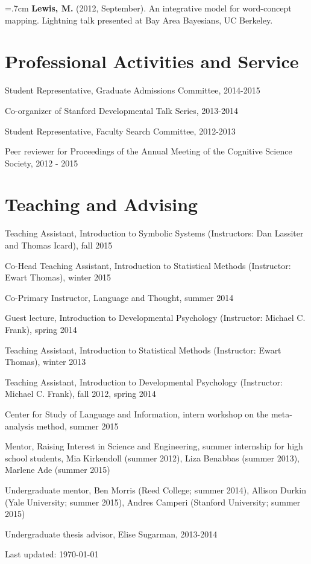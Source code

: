 \documentclass[letterpaper]{article}
\def\footerlink{}
\renewenvironment{itemize}{
  \begin{list}{}{
    \setlength{\leftmargin}{1.5em}
  }
}{
  \end{list}
}
\begin{document}
 
 \hangindent=.7cm {\bf Lewis, M.} (2012, September). An integrative model for word-concept mapping. Lightning talk presented at Bay Area Bayesians, UC Berkeley.
 
 


\section*{Professional Activities and Service}
\begin{itemize}
\item Student Representative, Graduate Admissions Committee, 2014-2015
\item  Co-organizer of Stanford Developmental Talk Series, 2013-2014
\item Student Representative, Faculty Search Committee, 2012-2013
\item Peer reviewer for Proceedings of the Annual Meeting of the Cognitive Science Society, 2012 -  2015
\end{itemize}

\section*{Teaching and Advising}
\begin{itemize}
\item Teaching Assistant, Introduction to Symbolic Systems (Instructors: Dan Lassiter and Thomas Icard), fall 2015
\item Co-Head Teaching Assistant, Introduction to Statistical Methods (Instructor: Ewart Thomas), winter 2015
\item Co-Primary Instructor, Language and Thought, summer 2014
\item Guest lecture, Introduction to Developmental Psychology (Instructor: Michael C. Frank), spring 2014
\item Teaching Assistant, Introduction to Statistical Methods (Instructor: Ewart Thomas), winter 2013
\item Teaching Assistant, Introduction to Developmental Psychology (Instructor: Michael C. Frank), fall 2012, spring 2014
\item Center for Study of Language and Information, intern workshop on the meta-analysis method, summer 2015
\item Mentor, Raising Interest in Science and Engineering, summer internship for high school students, Mia Kirkendoll (summer 2012),  Liza Benabbas (summer 2013), Marlene Ade (summer 2015)
\item Undergraduate mentor,  Ben Morris (Reed College; summer 2014), Allison Durkin (Yale University; summer 2015), Andres Camperi (Stanford University; summer 2015)
\item Undergraduate thesis advisor, Elise Sugarman,  2013-2014
\end{itemize}


\bigskip

\begin{center}
  \begin{footnotesize}
    Last updated: \today \\
    \href{\footerlink}{\texttt{\footerlink}}
  \end{footnotesize}
\end{center}
\end{document}
